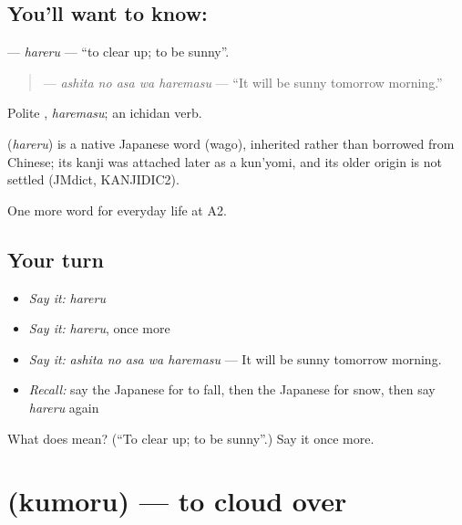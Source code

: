 \subsection*{You'll want to know: }
\textbf{} — \emph{hareru} — \textquotedblleft{}to clear up; to be sunny\textquotedblright{}.

\begin{quote}
\textbf{  } — \emph{ashita no asa wa haremasu} — \textquotedblleft{}It will be sunny tomorrow morning.\textquotedblright{}
\end{quote}

Polite \textbf{}, \emph{haremasu}; an ichidan verb.

\begin{cousinweb}
\textbf{} (\emph{hareru}) is a native Japanese word (wago), inherited rather than borrowed from Chinese; its kanji was attached later as a kun'yomi, and its older origin is not settled (JMdict, KANJIDIC2).
\end{cousinweb}

\begin{grammarlens}[title={What you've built}]
One more word for everyday life at A2.
\end{grammarlens}

\subsection*{Your turn}
\begin{itemize}
\raggedright
  \item \emph{Say it:} \emph{hareru}
  \item \emph{Say it:} \emph{hareru}, once more
  \item \emph{Say it:} \emph{ashita no asa wa haremasu} — It will be sunny tomorrow morning.
  \item \emph{Recall:} say the Japanese for to fall, then the Japanese for snow, then say \emph{hareru} again
\end{itemize}

\begin{tcolorbox}[breakable,colback=teal!4,colframe=teal!35!black,title={Before you move on}]
What does  mean? (\textquotedblleft{}To clear up; to be sunny\textquotedblright{}.) Say it once more.
\end{tcolorbox}
\section[\texorpdfstring{\ja{くもる} (kumoru)}{くもる (kumoru)}]{ (kumoru) — to cloud over}

